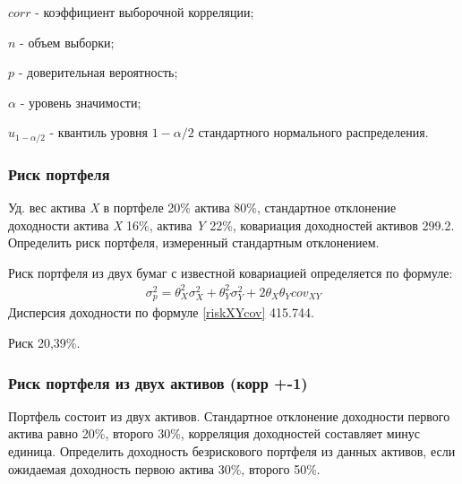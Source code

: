 \documentclass[12pt, table, a4paper,twoside]{exam}
\begin{document}
\begin{questions}
\begin{solution}[6em]
\raggedright
$corr$	-	коэффициент выборочной корреляции;

$n$	-	объем выборки;

$p$	-	доверительная вероятность;

$\alpha$	-	уровень значимости;

$u_{1-\alpha/2}$	-	квантиль уровня $1-\alpha/2$ стандартного нормального распределения.

\end{solution}


\subsubsection{Риск портфеля}
\question[10] Уд. вес актива \textit{X} в портфеле 20\% актива 80\%, стандартное отклонение доходности актива \textit{X} 16\%, актива \textit{Y} 22\%, ковариация доходностей активов 299.2. Определить риск портфеля, измеренный стандартным отклонением.

\begin{solution}[12em]

\raggedright
Риск портфеля из двух бумаг с известной ковариацией определяется по формуле:
\begin{align}
\label{riskXYcov}
\sigma_p^2=\theta_X^2\sigma_X^2+\theta_Y^2\sigma_Y^2+2\theta_X\theta_Ycov_{XY}
\end{align}
Дисперсия доходности по формуле \eqref{riskXYcov} 415.744.

Риск 20,39\%.
\end{solution}

\subsubsection{Риск портфеля из двух активов (корр +-1)}
\question[10] Портфель состоит из двух активов. Стандартное отклонение доходности первого актива равно 20\%, второго 30\%, корреляция доходностей составляет минус единица. Определить доходность безрискового портфеля из данных активов, если ожидаемая доходность первою актива 30\%, второго 50\%.

\begin{solution}[12em]


\end{solution}
\end{questions}
\end{document}

